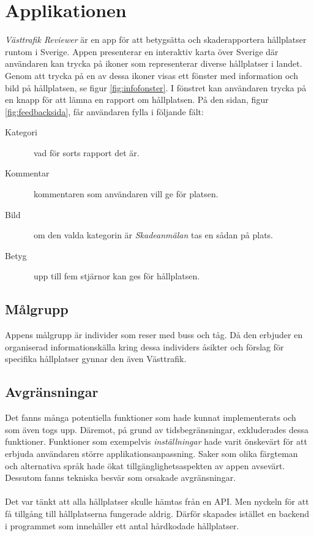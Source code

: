 \documentclass{article}
\begin{document}
\section*{Applikationen}
\textit{Västtrafik Reviewer} är en app för att betygsätta och skaderapportera hållplatser runtom i Sverige. Appen presenterar en interaktiv karta över Sverige där användaren kan trycka på ikoner som representerar diverse hållplatser i landet. Genom att trycka på en av dessa ikoner visas ett fönster med information och bild på hållplatsen, se figur \ref{fig:infofonster}. I fönstret kan användaren trycka på en knapp för att lämna en rapport om hållplatsen. På den sidan, figur \ref{fig:feedbacksida}, får användaren fylla i följande fält:
\begin{description}
\item[Kategori] \textendash\ vad för sorts rapport det är.
\item[Kommentar] \textendash\ kommentaren som användaren vill ge för platsen.
\item[Bild] \textendash\ om den valda kategorin är \textit{Skadeanmälan} tas en sådan på plats.
\item[Betyg] \textendash\ upp till fem stjärnor kan ges för hållplatsen.
\end{description}

\subsection*{Målgrupp}
Appens målgrupp är individer som reser med buss och tåg. Då den erbjuder en organiserad informationskälla kring dessa individers åsikter och förslag för specifika hållplatser gynnar den även Västtrafik. 

\subsection*{Avgränsningar}
Det fanns många potentiella funktioner som hade kunnat implementerats och som även togs upp. Däremot, på grund av tidsbegränsningar, exkluderades dessa funktioner. Funktioner som exempelvis \textit{inställningar} hade varit önskevärt för att erbjuda användaren större applikationsanpassning. Saker som olika färgteman och alternativa språk hade ökat tillgänglighetsaspekten av appen avsevärt. Dessutom fanns tekniska besvär som orsakade avgränsningar.
\\\\
Det var tänkt att alla hållplatser skulle hämtas från en API. Men nyckeln för att få tillgång till hållplatserna fungerade aldrig. Därför skapades istället en backend i programmet som innehåller ett antal hårdkodade hållplatser. 
\end{document}
